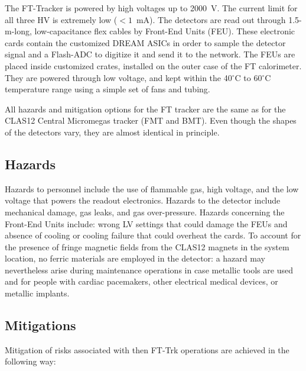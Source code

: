 The FT-Tracker is powered by high voltages up to 2000~V. The current limit for all three HV is 
extremely low ($< 1$~mA). The detectors are read out through 1.5-m-long, low-capacitance flex 
cables by Front-End Units (FEU). These electronic cards contain the customized DREAM ASICs in 
order to sample the detector signal and a Flash-ADC to digitize it and send it to the network. 
The FEUs are placed inside customized crates, installed on the outer case of the FT calorimeter. 
They are powered through low voltage, and kept within the 40$^\circ$C to 60$^\circ$C temperature 
range using a simple set of fans and tubing.

All hazards and mitigation options for the FT tracker are the same as for the CLAS12 Central 
Micromegas tracker (FMT and BMT). Even though the shapes of the detectors vary, they are almost 
identical in principle. 

\subsection{Hazards}

Hazards to personnel include the use of flammable gas, high voltage, and the low voltage that 
powers the readout electronics. Hazards to the detector include mechanical damage, gas leaks, 
and gas over-pressure. Hazards concerning the Front-End Units include: wrong LV settings that 
could damage the FEUs and absence of cooling or cooling failure that could overheat the cards. 
To account for the presence of fringe magnetic fields from the CLAS12 magnets in the system 
location, no ferric materials are employed in the detector: a hazard may nevertheless arise 
during maintenance operations in case metallic tools are used and for people with cardiac 
pacemakers, other electrical medical devices, or metallic implants.

\subsection{Mitigations}

Mitigation of risks associated with then FT-Trk operations are achieved in the following way:

